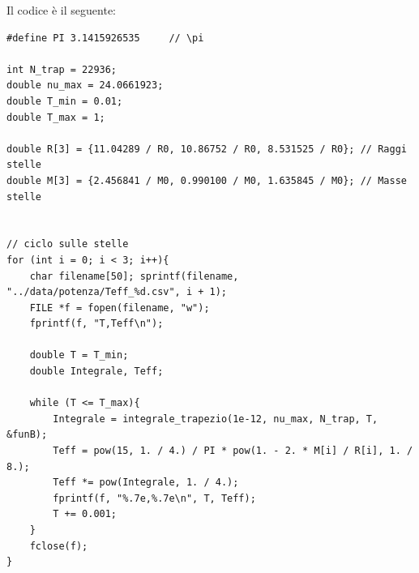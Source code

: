 \documentclass[a4paper, titlepage]{article}
\begin{document}
Il codice è il seguente:

\begin{lstlisting}
#define PI 3.1415926535     // \pi

int N_trap = 22936;
double nu_max = 24.0661923;
double T_min = 0.01;
double T_max = 1;

double R[3] = {11.04289 / R0, 10.86752 / R0, 8.531525 / R0}; // Raggi stelle
double M[3] = {2.456841 / M0, 0.990100 / M0, 1.635845 / M0}; // Masse stelle


// ciclo sulle stelle
for (int i = 0; i < 3; i++){
    char filename[50]; sprintf(filename, "../data/potenza/Teff_%d.csv", i + 1);
    FILE *f = fopen(filename, "w");
    fprintf(f, "T,Teff\n");

    double T = T_min;
    double Integrale, Teff;

    while (T <= T_max){
        Integrale = integrale_trapezio(1e-12, nu_max, N_trap, T, &funB);
        Teff = pow(15, 1. / 4.) / PI * pow(1. - 2. * M[i] / R[i], 1. / 8.);
        Teff *= pow(Integrale, 1. / 4.);
        fprintf(f, "%.7e,%.7e\n", T, Teff);
        T += 0.001;
    }
    fclose(f);
}
\end{lstlisting}
\end{document}

